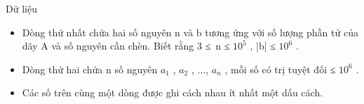 Dữ liệu
\begin{itemize}
	\item     Dòng thứ nhất chứa hai số nguyên n và b tương ứng với số lượng phần tử của dãy A và số nguyên cần chèn. Biết rằng 3 ≤ n ≤ $10^{5}$    , |b| ≤ $10^{6}$    .   
	\item     Dòng thứ hai chứa n số nguyên $a_{1}$    , $a_{2}$    , ..., $a_{n}$    , mỗi số có trị tuyệt đối ≤ $10^{6}$    .   
	\item     Các số trên cùng một dòng được ghi cách nhau ít nhất một dấu cách.   
\end{itemize}